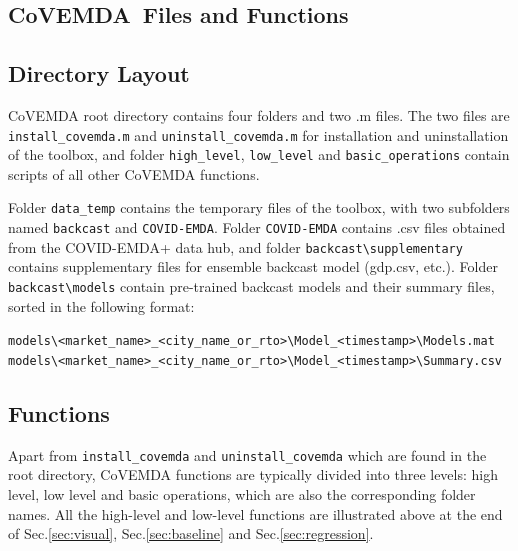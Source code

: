 \documentclass[10pt]{article}
\newcommand{\covemda}{CoVEMDA}
\numberwithin{equation}{section}
\numberwithin{table}{section}
\numberwithin{figure}{section}
\begin{document}
\begin{appendices}

\newpage
\section{\covemda{}~Files and Functions} \label{sec:}

\subsection{Directory Layout}

\covemda{} root directory contains four folders and two .m files. The two files are \verb!install_covemda.m! and \verb!uninstall_covemda.m! for installation and uninstallation of the toolbox, and folder \verb!high_level!, \verb!low_level! and \verb!basic_operations! contain scripts of all other \covemda{} functions.

Folder \verb!data_temp! contains the temporary files of the toolbox, with two subfolders named \verb!backcast! and \verb!COVID-EMDA!. Folder \verb!COVID-EMDA! contains .csv files obtained from the COVID-EMDA+ data hub, and folder \verb!backcast\supplementary! contains supplementary files for ensemble backcast model (gdp.csv, etc.). Folder \verb!backcast\models! contain pre-trained backcast models and their summary files, sorted in the following format:
\begin{center}
    \verb!models\<market_name>_<city_name_or_rto>\Model_<timestamp>\Models.mat!
    \verb!models\<market_name>_<city_name_or_rto>\Model_<timestamp>\Summary.csv!
\end{center}



\subsection{Functions}  \label{subsec:func_list}

Apart from \verb!install_covemda! and \verb!uninstall_covemda! which are found in the root directory, \covemda{} functions are typically divided into three levels: high level, low level and basic operations, which are also the corresponding folder names. All the high-level and low-level functions are illustrated above at the end of Sec.\ref{sec:visual}, Sec.\ref{sec:baseline} and Sec.\ref{sec:regression}.


\end{appendices}
\end{document}
